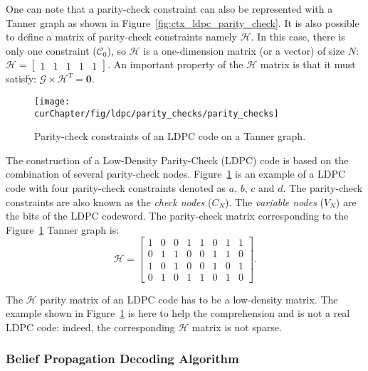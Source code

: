 One can note that a parity-check constraint can also be represented with a
Tanner graph as shown in Figure~\ref{fig:ctx_ldpc_parity_check}. It is also
possible to define a matrix of parity-check constraints namely
$\bm{\mathcal{H}}$. In this case, there is only one constraint
($\mathcal{C}_0$), so $\bm{\mathcal{H}}$ is a one-dimension matrix (or a vector)
of size $N$:
$
\bm{\mathcal{H}} =
\begin{bmatrix}
1 & 1 & 1 & 1 & 1
\end{bmatrix}.
$
An important property of the $\bm{\mathcal{H}}$ matrix is that it must satisfy:
$\bm{\mathcal{G}} \times \bm{\mathcal{H}}^T = \bm{0}.$

\begin{figure}[htp]
  \centering
  \texttt{[image: \\curChapter/fig/ldpc/parity\_checks/parity\_checks]}
  \caption{Parity-check constraints of an LDPC code on a Tanner graph.}
  \label{fig:ctx_ldpc_parity_checks}
\end{figure}

The construction of a Low-Density Parity-Check (LDPC) code is based on the
combination of several parity-check nodes.
Figure~\ref{fig:ctx_ldpc_parity_checks} is an example of a LDPC code with four
parity-check constraints denoted as $a$, $b$, $c$ and $d$. The parity-check
constraints are also known as the \emph{check nodes} ($C_N$). The \emph{variable
nodes} ($V_N$) are the bits of the LDPC codeword. The parity-check matrix
corresponding to the Figure~\ref{fig:ctx_ldpc_parity_checks} Tanner graph is:
\begin{equation*}
\bm{\mathcal{H}} =
\begin{bmatrix}
  1 & 0 & 0 & 1 & 1 & 0 & 1 & 1\\
  0 & 1 & 1 & 0 & 0 & 1 & 1 & 0\\
  1 & 0 & 1 & 0 & 0 & 1 & 0 & 1\\
  0 & 1 & 0 & 1 & 1 & 0 & 1 & 0
\end{bmatrix}.
\end{equation*}

The $\bm{\mathcal{H}}$ parity matrix of an LDPC code has to be a low-density
matrix. The example shown in
Figure~\ref{fig:ctx_ldpc_parity_checks} is here to help the comprehension and
is not a real LDPC code: indeed, the corresponding $\bm{\mathcal{H}}$ matrix is
not sparse.

\subsubsection{Belief Propagation Decoding Algorithm}

